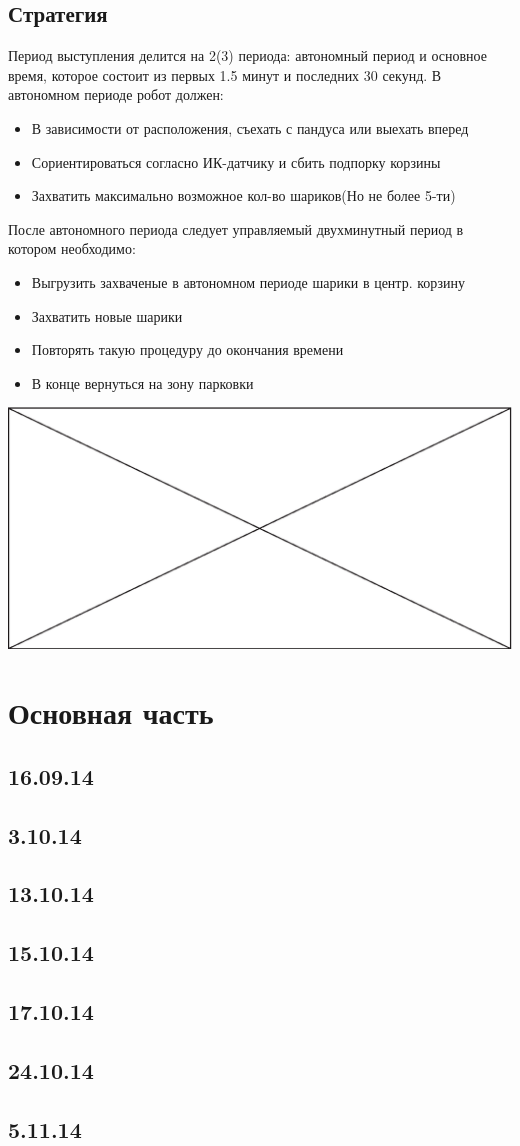\documentclass[11pt]{article}
\newcommand\measurepage{\dimexpr\pagegoal-\pagetotal-\baselineskip\relax}
\newcommand\fillpage{\includegraphics[width=\textwidth, height=\measurepage]{img/fill_page.eps}}
\begin{document}
		\subsection{Стратегия}
			Период выступления делится на 2(3) периода: автономный период и основное время, которое состоит из первых 1.5 минут и последних 30 секунд.
			В автономном периоде робот должен:
			\begin{itemize}
				\item В зависимости от расположения, съехать с пандуса или выехать вперед
				\item Сориентироваться согласно ИК-датчику и сбить подпорку корзины
				\item Захватить максимально возможное кол-во шариков(Но не более 5-ти)
			\end{itemize}
			После автономного периода следует управляемый двухминутный период в котором необходимо:
			\begin{itemize}
				\item Выгрузить захваченые в автономном периоде шарики в центр. корзину
				\item Захватить новые шарики 
				\item Повторять такую процедуру до окончания времени
				\item В конце вернуться на зону парковки
			\end{itemize}
			\fillpage
		
	\section{Основная часть}
	
	\subsection{16.09.14}
	
	
	\subsection{3.10.14}
	
	
	\subsection{13.10.14}
	
	
	\subsection{15.10.14}
	
	
	\subsection{17.10.14}
	

	\subsection{24.10.14}
		
	
	\subsection{5.11.14}
		
\end{document}
